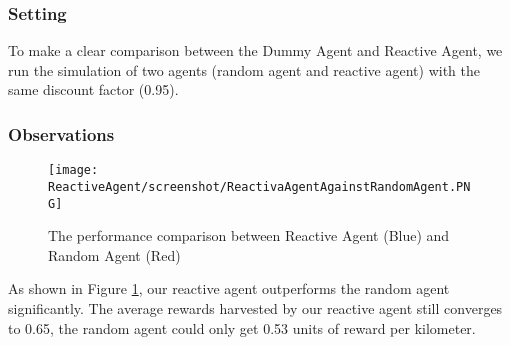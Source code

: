 \documentclass[11pt]{article}
\begin{document}
\subsubsection{Setting}
To make a clear comparison between the Dummy Agent and Reactive Agent, we run the simulation of two agents (random agent and reactive agent) with the same discount factor (0.95).
\subsubsection{Observations}
\begin{figure}[H]
 \begin{center}
  \texttt{[image: ReactiveAgent/screenshot/ReactivaAgentAgainstRandomAgent.PNG]}
  \caption{The performance comparison between Reactive Agent ({\color{blue}Blue}) and Random Agent ({\color{red}Red})}
  \label{fig:ReactivaAgentAgainstRandomAgent}
 \end{center}
\end{figure}

As shown in Figure \ref{fig:ReactivaAgentAgainstRandomAgent}, our reactive agent outperforms the random agent significantly. The average rewards harvested by our reactive agent still converges to 0.65, the random agent could only get 0.53 units of reward per kilometer.
\end{document}
